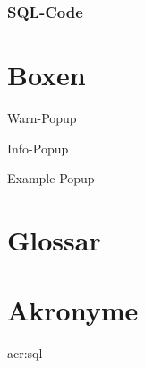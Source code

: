 \subsubsection{SQL-Code}


\section{Boxen}
\begin{warn-popup}
  Warn-Popup
\end{warn-popup}

\begin{info-popup}
  Info-Popup
\end{info-popup}

\begin{example-popup}
  Example-Popup
\end{example-popup}

\section{Glossar}

\section{Akronyme}
\acrfull{acr:sql}
